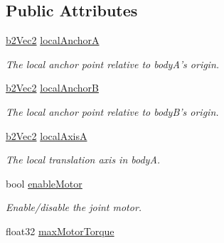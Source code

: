 \subsection*{Public Attributes}
\begin{DoxyCompactItemize}
\item 
\hypertarget{structb2_wheel_joint_def_a9429d2273bfdd8bdc0db416e73b89ae4}{\hyperlink{structb2_vec2}{b2\-Vec2} \hyperlink{structb2_wheel_joint_def_a9429d2273bfdd8bdc0db416e73b89ae4}{local\-Anchor\-A}}\label{structb2_wheel_joint_def_a9429d2273bfdd8bdc0db416e73b89ae4}

\begin{DoxyCompactList}\small\item\em The local anchor point relative to body\-A's origin. \end{DoxyCompactList}\item 
\hypertarget{structb2_wheel_joint_def_a88ba0f7108076b9d7ced68425be95c27}{\hyperlink{structb2_vec2}{b2\-Vec2} \hyperlink{structb2_wheel_joint_def_a88ba0f7108076b9d7ced68425be95c27}{local\-Anchor\-B}}\label{structb2_wheel_joint_def_a88ba0f7108076b9d7ced68425be95c27}

\begin{DoxyCompactList}\small\item\em The local anchor point relative to body\-B's origin. \end{DoxyCompactList}\item 
\hypertarget{structb2_wheel_joint_def_ad635ee7b77b50037dc0e021a0f5c93a6}{\hyperlink{structb2_vec2}{b2\-Vec2} \hyperlink{structb2_wheel_joint_def_ad635ee7b77b50037dc0e021a0f5c93a6}{local\-Axis\-A}}\label{structb2_wheel_joint_def_ad635ee7b77b50037dc0e021a0f5c93a6}

\begin{DoxyCompactList}\small\item\em The local translation axis in body\-A. \end{DoxyCompactList}\item 
\hypertarget{structb2_wheel_joint_def_a8e7193d6c34c784ffd71e79d3a70acc6}{bool \hyperlink{structb2_wheel_joint_def_a8e7193d6c34c784ffd71e79d3a70acc6}{enable\-Motor}}\label{structb2_wheel_joint_def_a8e7193d6c34c784ffd71e79d3a70acc6}

\begin{DoxyCompactList}\small\item\em Enable/disable the joint motor. \end{DoxyCompactList}\item 
\hypertarget{structb2_wheel_joint_def_ab658ce0fae40c6de09133659f7ffb829}{float32 \hyperlink{structb2_wheel_joint_def_ab658ce0fae40c6de09133659f7ffb829}{max\-Motor\-Torque}}\label{structb2_wheel_joint_def_ab658ce0fae40c6de09133659f7ffb829}


\end{DoxyCompactItemize}
